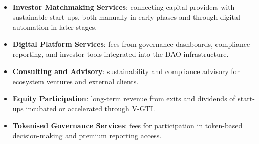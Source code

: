 \documentclass[
  english,
  12pt,
  oneside,
  open=any]{scrbook}
\providecommand{\tightlist}{%
  \setlength{\itemsep}{0pt}\setlength{\parskip}{0pt}}\usepackage{longtable,booktabs,array}
\begin{document}
\begin{itemize}
\tightlist
\item
  \textbf{Investor Matchmaking Services}: connecting capital providers
  with sustainable start-ups, both manually in early phases and through
  digital automation in later stages.\\
\item
  \textbf{Digital Platform Services}: fees from governance dashboards,
  compliance reporting, and investor tools integrated into the DAO
  infrastructure.\\
\item
  \textbf{Consulting and Advisory}: sustainability and compliance
  advisory for ecosystem ventures and external clients.\\
\item
  \textbf{Equity Participation}: long-term revenue from exits and
  dividends of start-ups incubated or accelerated through V-GTI.\\
\item
  \textbf{Tokenised Governance Services}: fees for participation in
  token-based decision-making and premium reporting access.
\end{itemize}
\end{document}
